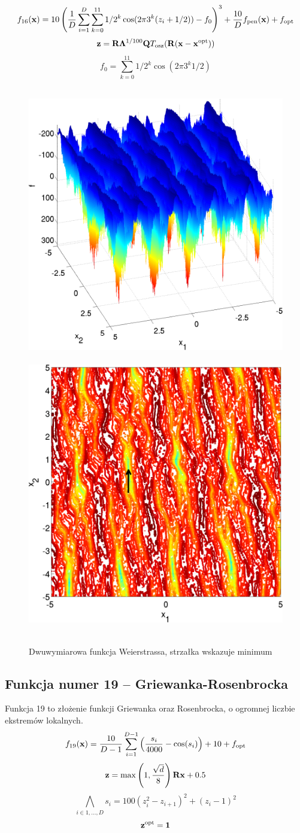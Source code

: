\documentclass[a4paper,onecolumn,oneside,12pt,wide,floatssmall]{mwrep}
\theoremstyle{definition}
\theoremstyle{plain}%
\theoremstyle{remark}
\begin{document}
$$ f_{16}(\bold{x}) = 10 \left( \frac{1}{D} \sum^D_{i=1} \sum^{11}_{k=0} 1 / 2^k \cos(2 \pi 3^k(z_i + 1/2)) - f_0 \right)^3 + \frac{10}{D} f_\text{pen}(\bold{x}) + f_\text{opt} $$
$$ \bold{z} = \bold{R} \bold{\Lambda}^{1/100} \bold{Q} T_\text{osz}(\bold{R}(\bold{x} - \bold{x}^\text{opt})) $$
$$ f_0 = \sum^{11}_{k=0} 1/2^k \cos(2 \pi 3^k 1/2) $$

\begin{figure}[H]
\centering
\mbox{
\includegraphics[width=.45\textwidth]{img/16.png} \quad
\includegraphics[width=.45\textwidth]{img/16a.png} 
}
\caption{Dwuwymiarowa funkcja Weierstrassa, strzałka wskazuje minimum \cite{noiseless}}
\end{figure}

\subsection{Funkcja numer 19 -- Griewanka-Rosenbrocka}

Funkcja 19 to złożenie funkcji Griewanka oraz Rosenbrocka, o ogromnej liczbie ekstremów lokalnych.
$$ f_{19}(\bold{x}) = \frac{10}{D - 1} \sum^{D-1}_{i=1}\left(\frac{s_i}{4000} - \cos(s_i)\right) + 10 + f_\text{opt} $$
$$ \bold{z} = \max\left(1, \frac{\sqrt{d}}{8}\right) \bold{Rx} + 0.5 $$
$$ \bigwedge_{i \in 1, \dots, D} s_i = 100(z^2_i - z_{i+1})^2 + (z_i - 1)^2 $$
$$ \bold{z}^\text{opt} = \bold{1} $$
\end{document}
